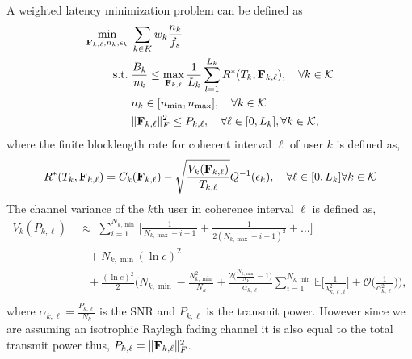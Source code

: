 \documentclass[a4paper, 12pt, onecolumn, journal, twoside, draftclsnofoot]{IEEEtran}
\begin{document}
A weighted latency minimization problem can be defined as 
\begin{equation}
	\begin{split}
		\min_{{\bf F}_{k,\ell}, n_k, \epsilon_k} \;& \sum_{k \in K} w_k \frac{n_k}{f_s} \\
		\text{s.t.}\;& \frac{B_k}{n_k} \leq \max_{{\bf F}_{k, \ell}} \frac{1}{L_k} \sum_{l=1}^{L_k} R^*(T_{k}, {\bf F}_{k, \ell}), \quad \forall k \in { \mathcal{K} } \\ 
		& n_k \in [n_{\text{min}}, n_{\text{max}}], \quad \forall k \in { \mathcal{K} } \\
		& \|{\bf F}_{k,\ell}\|_F^2 \leq P_{k,\ell}, \quad \forall \ell \in [0, L_k],  \forall k \in { \mathcal{K} },
	\end{split}
\label{eq_short_blocklength_latency_min_prob}
\end{equation}
where the finite blocklength rate for coherent interval $\ell$ of user $k$ is defined as, 
\begin{equation*}
R^*(T_{k} , {\bf F}_{k,\ell}) =  C_k({\bf F}_{k,\ell}) - \sqrt{ \frac{V_k({\bf F}_{k,\ell})}{ T_{k, \ell} } } Q^{-1}  (\epsilon_k), \quad \forall \ell \in [0,L_k] \forall k \in { \mathcal{K} }\\
\end{equation*}
The channel variance of the $k$th user in coherence interval $\ell$ is defined as, 
\begin{equation*}
	\begin{aligned}
		V_k(P_{k,\ell}) 
		&\;\approx\; \sum_{i=1}^{N_{k, \min}} \Bigg[
    	\frac{1}{\,N_{k, \max}-i+1\,}
    		+ \frac{1}{2 (N_{k, \max}-i+1)^2}
    		+ \dots
		\Bigg] \\[0.6em]
		&\quad + N_{k, \min} (\ln e)^2 \\[0.6em]
		&\quad + \frac{(\ln e)^2}{2} \Bigg(
		N_{k, \min} - \frac{N_{k, \min}^2}{N_k}
		+ \frac{2 \Big( \frac{N_{k, \min}}{N_k} - 1 \Big)}{\alpha_{k,\ell}} 
        \sum_{i=1}^{N_{k, \min}} \mathbb{E} \Big[ \frac{1}{\lambda_{k, \ell, i}^2} \Big]
		+ \mathcal{O}\Big( \frac{1}{\alpha_{k,\ell}^2} \Big)
		\Bigg), \\[0.6em]
	\end{aligned}
\end{equation*}
where $\alpha_{k,\ell} = \frac{P_{k,\ell}}{N_k}$ is the SNR and $P_{k,\ell}$ is the transmit power. However since we are assuming an isotrophic Raylegh fading channel it is also equal to the total transmit power thus, $P_{k,\ell} = \|{\bf F}_{k,\ell}\|_F^2 $.
\end{document}
